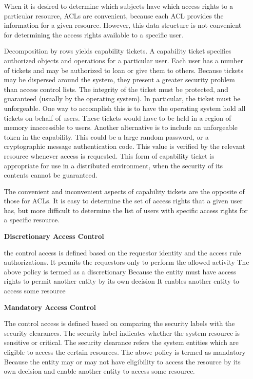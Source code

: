 \documentclass[../CIT288SecurityResearchNotebook.tex]{subfiles}
\begin{document}
When it is desired to determine which subjects have which access 
rights to a particular resource, ACLs are convenient, 
because each ACL provides the information for a given resource. 
However, this data structure is not convenient for determining 
the access rights available to a specific user.


Decomposition by rows yields capability tickets. A capability 
ticket specifies authorized objects and operations for a 
particular user. Each user has a number of tickets and 
may be authorized to loan or give them to others. 
Because tickets may be dispersed around the system, 
they present a greater security problem than access 
control lists. The integrity of the ticket must be 
protected, and guaranteed (usually by the operating system).
In particular, the ticket must be unforgeable. 
One way to accomplish this is to have the operating system 
hold all tickets on behalf of users. These tickets would have to 
be held in a region of memory inaccessible to users. 
Another alternative is to include an unforgeable 
token in the capability. This could be a large random 
password, or a cryptographic message authentication code. 
This value is verified by the relevant resource whenever 
access is requested. This form of capability ticket is 
appropriate for use in a distributed environment, 
when the security of its contents cannot be guaranteed.


The convenient and inconvenient aspects of capability 
tickets are the opposite of those for ACLs. 
It is easy to determine the set of access rights that a 
given user has, but more difficult to determine the 
list of users with specific access rights for a specific resource.



{\bf{Discretionary Access Control}}
\begin{outline}\centering
	\1 the control access is defined based on the requestor identity 
	and the access rule authorizations.
	\1 It permits the requestors only to perform the allowed activity
	\1 The above policy is termed as a discretionary
	\1 Because the entity must have access rights to permit another
	entity by its own decision
	\1 It enables another entity to access some resource
\end{outline}

\clearpage

{\bf{Mandatory Access Control}}
\begin{outline}\centering
	\1 The control access is defined based on comparing the security
	labels with the security clearances.
	\1 The security label indicates whether the system resource
	is sensitive or critical.
	\1 The security clearance refers the system entities which are
	eligible to access the certain resources.
	\1 The above policy is termed as mandatory
	\1 Because the entity may or may not have eligibility to access
	the resource by its own decision and enable another entity
	to access some resource.
\end{outline}
\end{document}
